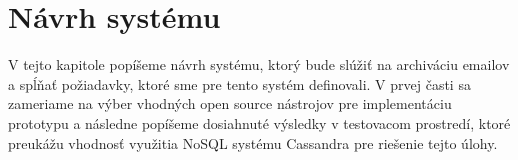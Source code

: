 \documentclass[11pt,twoside,a4paper]{book}
\begin{document}
% 
% 
% 
% 
% 
% 

\chapter{Návrh systému}

V tejto kapitole popíšeme návrh systému, ktorý bude slúžiť na archiváciu emailov a spĺňať požiadavky, ktoré sme pre tento systém definovali. V prvej časti sa zameriame na výber vhodných open source nástrojov pre implementáciu prototypu a následne popíšeme dosiahnuté výsledky v testovacom prostredí, ktoré preukážu vhodnosť využitia NoSQL systému Cassandra pre riešenie tejto úlohy.
\end{document}
